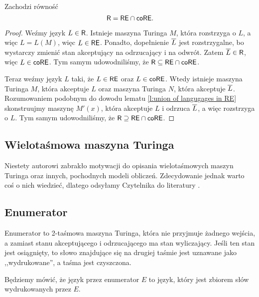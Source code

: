 \begin{theorem}
    Zachodzi równość
    \[ \textsf{R} = \textsf{RE} \cap \textsf{coRE}. \]
\end{theorem}
\begin{proof}
    Weźmy język $L \in \textsf{R}$. Istnieje maszyna Turinga $M$, która rozstrzyga o $L$, a więc $L = L(M)$, więc $L \in \textsf{RE}$. Ponadto, dopełnienie $\overline{L}$ jest rozstrzygalne, bo wystarczy zmienić stan akceptujący na odrzucający i na odwrót. Zatem $\overline{L} \in \textsf{R}$, więc $L \in \textsf{coRE}$. Tym samym udowodniliśmy, że $\textsf{R} \subseteq \textsf{RE} \cap \textsf{coRE}$.

    Teraz weźmy język $L$ taki, że $L \in \textsf{RE}$ oraz $L \in \textsf{coRE}$. Wtedy istnieje maszyna Turinga $M$, która akceptuje $L$ oraz maszyna Turinga $N$, która akceptuje $\overline{L}$. Rozumowaniem podobnym do dowodu lematu \ref{l:union of langugages in RE} skonstruujmy maszynę $M'(x)$, która akceptuje $L$ i odrzuca $\overline{L}$, a więc rozstrzyga o $L$. Tym samym udowodniliśmy, że $\textsf{R} \supseteq \textsf{RE} \cap \textsf{coRE}$.
\end{proof}

\subsection{Wielotaśmowa maszyna Turinga}

Niestety autorowi zabrakło motywacji do opisania wielotaśmowych maszyn Turinga oraz innych, pochodnych modeli obliczeń. Zdecydowanie jednak warto coś o nich wiedzieć, dlatego odsyłamy Czytelnika do literatury \cite{Adleman, Sipser}.

\subsection{Enumerator}
\begin{definition}
    Enumerator to 2-taśmowa maszyna Turinga, która nie przyjmuje żadnego wejścia, a zamiast stanu akceptującego i odrzucającego ma stan wyliczający. Jeśli ten stan jest osiągnięty, to słowo znajdujące się na drugiej taśmie jest uznawane jako ,,wydrukowane'', a taśma jest czyszczona.
\end{definition}

Będziemy mówić, że język  przez enumerator $E$ to język, który jest zbiorem słów wydrukowanych przez $E$.

